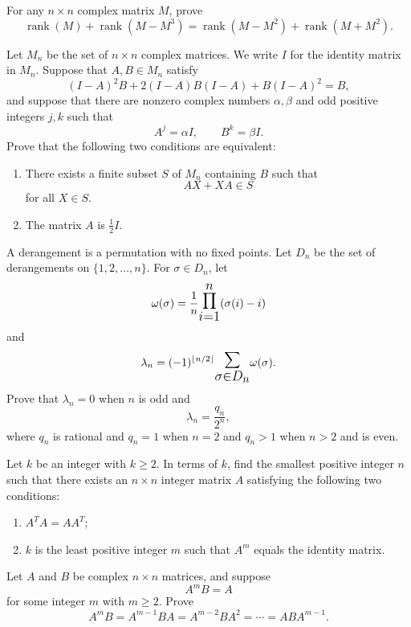 \documentclass[12pt]{article}
\let\oldsum\sum
\let\oldprod\prod
\renewcommand{\sum}{\mathlarger{\mathlarger{\oldsum}}}
\renewcommand{\prod}{\mathlarger{\mathlarger{\oldprod}}}
\begin{document}
\begin{problem}
For any $n\times n$ complex matrix $M$, prove
\[
\operatorname{rank}(M)+\operatorname{rank}(M-M^3)
=
\operatorname{rank}(M-M^2)+\operatorname{rank}(M+M^2).
\]
\end{problem}

\begin{problem}
Let $M_n$ be the set of $n\times n$ complex matrices. We write $I$ for the identity
matrix in $M_n$. Suppose that $A,B\in M_n$ satisfy
\[
(I-A)^2B+2(I-A)B(I-A)+B(I-A)^2=B,
\]
and suppose that there are nonzero complex numbers $\alpha,\beta$ and odd positive
integers $j,k$ such that
\[
A^j=\alpha I,\qquad B^k=\beta I.
\]
Prove that the following two conditions are equivalent:
\begin{enumerate}
    \item There exists a finite subset $S$ of $M_n$ containing $B$ such that
    \[
    AX+XA\in S
    \]
    for all $X\in S$.
    \item The matrix $A$ is $\frac12 I$.
\end{enumerate}
\end{problem}

\begin{problem}
A derangement is a permutation with no fixed points. Let $D_n$ be the set of derangements
on $\{1,2,\ldots,n\}$. For $\sigma\in D_n$, let
\[
\omega(\sigma)=\frac1n\prod_{i=1}^{n}(\sigma(i)-i)
\]
and
\[
\lambda_n=(-1)^{\lfloor n/2\rfloor}\sum_{\sigma\in D_n}\omega(\sigma).
\]
Prove that $\lambda_n=0$ when $n$ is odd and
\[
\lambda_n=\frac{q_n}{2^n},
\]
where $q_n$ is rational and $q_n=1$ when $n=2$ and $q_n>1$ when $n>2$ and is even.
\end{problem}

\begin{problem}
Let $k$ be an integer with $k\ge2$. In terms of $k$, find the smallest positive integer
$n$ such that there exists an $n\times n$ integer matrix $A$ satisfying the following
two conditions:
\begin{enumerate}
    \item $A^TA=AA^T$;
    \item $k$ is the least positive integer $m$ such that $A^m$ equals the identity matrix.
\end{enumerate}
\end{problem}

\begin{problem}
Let $A$ and $B$ be complex $n\times n$ matrices, and suppose
\[
A^mB=A
\]
for some integer $m$ with $m\ge2$. Prove
\[
A^mB
=
A^{m-1}BA
=
A^{m-2}BA^2
=
\cdots
=
ABA^{m-1}.
\]
\end{problem}
\end{document}
